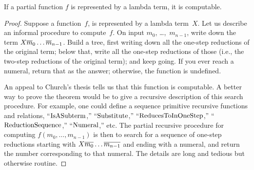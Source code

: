 \documentclass[../../../include/open-logic-section]{subfiles}
\begin{document}

\begin{thm}
If a partial function $f$ is represented by a lambda term, it is
computable.
\end{thm}

\begin{proof}
Suppose a function~$f$, is represented by a lambda term~$X$. Let us
describe an informal procedure to compute~$f$. On input $m_0$,
\dots,~$m_{n-1}$, write down the term $X \overline{m}_0 \ldots \overline{m}_{n-1}$. Build a tree, first writing down all the one-step reductions
of the original term; below that, write all the one-step reductions of
those (i.e., the two-step reductions of the original term); and keep
going. If you ever reach a numeral, return that as the answer;
otherwise, the function is undefined.

An appeal to Church's thesis tells us that this function is
computable. A better way to prove the theorem would be to give a
recursive description of this search procedure. For example, one
could define a sequence primitive recursive functions and relations,
``$\mathrm{IsASubterm}$,'' ``$\mathrm{Substitute}$,''
``$\mathrm{ReducesToInOneStep}$,'' ``$\mathrm{ReductionSequence}$,''
``$\mathrm{Numeral}$,'' etc. The partial recursive procedure for computing
$f(m_0, \dots, m_{n-1})$ is then to search for a sequence of one-step
reductions starting with $X \overline{m_0} \dots \overline{m_{n-1}}$ and ending
with a numeral, and return the number corresponding to that numeral.
The details are long and tedious but otherwise routine.
\end{proof}
\end{document}
